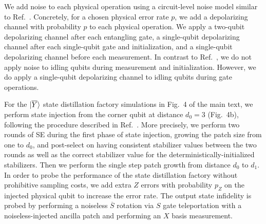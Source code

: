 We add noise to each physical operation using a  circuit-level noise model similar to  Ref.~\cite{higgott2023improved}. 
Concretely, for a chosen physical error rate $p$, we add a depolarizing channel with probability $p$ to each physical operation. We apply a two-qubit depolarizing channel after each entangling gate, a single-qubit depolarizing channel after each single-qubit gate and initialization, and a single-qubit depolarizing channel before each measurement. 
In contrast to Ref.~\cite{higgott2023improved}, we do not apply noise to idling qubits during measurement and initialization. 
However, we do apply a single-qubit depolarizing channel to idling qubits during gate operations.

For the $|{\overline{Y}}\rangle$ state distillation factory simulations in Fig.~4 of the main text, we perform state injection from the corner qubit at distance $d_0=3$ (Fig.~4b), following the procedure described in Ref.~\cite{lao2022magic}.
%
More precisely, we perform two rounds of SE during the first phase of state injection, growing the patch size from one to $d_0$, and post-select on having consistent stabilizer values between the two rounds as well as the correct stabilizer value for the deterministically-initialized stabilizers. Then we perform the single step patch growth from distance $d_0$ to $d_1$.
%
In order to probe the performance of the state distillation factory without prohibitive sampling costs, we add extra $Z$ errors with probability $p_{Z}$ on the injected physical qubit to increase the error rate.
%
The output state infidelity is probed by performing a noiseless $\overline{S}$ rotation via $S$ gate teleportation with a noiseless-injected ancilla patch and performing an $X$ basis measurement.

